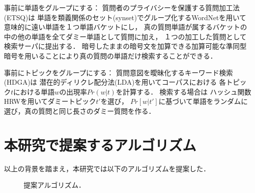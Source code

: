 \documentclass[papersize]{suribtabst}
\begin{document}
事前に単語をグループにする：
質問者のプライバシーを保護する質問加工法(ETSQ)は
単語を類義関係のセット(synset)でグループ化するWordNet\cite{wordnet1995}を用いて意味的に遠い単語を１つ単語バケットにし，
真の質問単語が属するバケットの中の他の単語を全てダミー単語として質問に加え，
１つの加工した質問として検索サーパに提出する．
暗号したままの暗号文を加算できる加算可能な準同型暗号\cite{dpe1994}を用いることにより真の質問の単語だけ検索することができる．

事前にトピックをグループにする：
質問意図を曖昧化するキーワード検索(HDGA)は
潜在的ディリクレ配分法(LDA)\cite{lda2003}を用いてコーパスにおける
各トピック$t$における単語$w$の出現率$Pr(w|t)$を計算する．
検索する場合は
ハッシュ関数HRW\cite{hrw1998}を用いてダミートピック$t'$を選び，
$Pr[w|t']$に基づいて単語をランダムに選び，真の質問と同じ長さのダミー質問を作る．

\clearpage

\section{本研究で提案するアルゴリズム}

以上の背景を踏まえ，本研究では以下のアルゴリズムを提案した．

\begin{figure}[htbp]
\centering
\fbox{\rule{0cm}{3cm}\rule{5cm}{0cm}}
\caption{提案アルゴリズム．}
\end{figure}





\begin{thebibliography}{99} %
\end{thebibliography}
\end{document}
